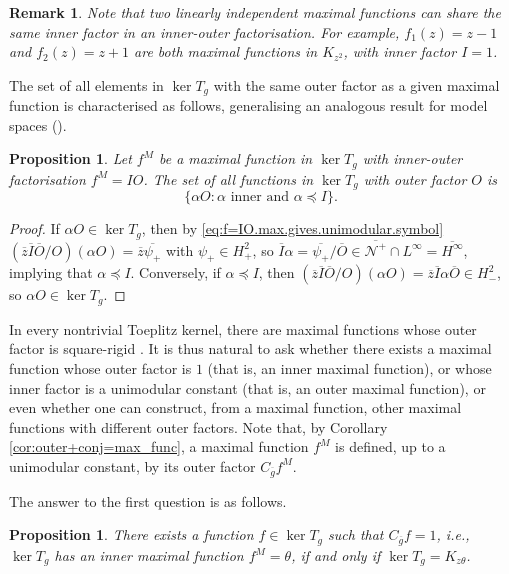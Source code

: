 \documentclass[12pt]{elsarticle}
\numberwithin{equation}{section}
\theoremstyle{plain}
\newtheorem{prop}[thm]{Proposition}
\newtheorem{rem}[thm]{Remark}
\newcommand{\Hp}{\ensuremath{H^2_+}}
\newcommand{\Hm}{\ensuremath{H^2_-}}
\newcommand{\Linf}{\ensuremath{L^\infty}}
\newcommand{\Hinf}{\ensuremath{H^\infty}}
\newcommand{\NN}{\ensuremath{\mathcal{N}^+}}
\newcommand{\Cg}{\ensuremath{C_{\ol g}}}
\newcommand{\ol}[1]{\ensuremath{\overline{#1}}}
\begin{document}
\begin{rem}
Note that two linearly independent maximal functions can share the same inner factor in an inner-outer factorisation.
For example, $f_1 (z) = z-1$ and $f_2(z) = z+1$ are both maximal functions  in $K_{z^2}$, with inner factor $I=1$.
\end{rem}


The set of all elements in $\ker T_g$ with the same outer factor as a given maximal function is characterised as follows, generalising an analogous result for model spaces (\cite[Proposition 8.20]{GarMashRoss16}).


\begin{prop}
Let $f^M$ be a maximal function in $\ker T_g$ with inner-outer factorisation $f^M = IO$.
The set of all functions in $\ker T_g$ with outer factor $O$ is
\[
\{ \alpha O : \alpha \text{ inner and } \alpha \preceq I \}.
\]
\end{prop}


\begin{proof}
If $\alpha O \in \ker T_g$, then by \eqref{eq:f=IO.max.gives.unimodular.symbol} $(\ol z \ol I \ol O / O) (\alpha O) = \ol z \ol{\psi_+}$ with $\psi_+ \in \Hp$, so $\ol I \alpha = \ol{\psi_+} / \ol O \in \ol\NN \cap \Linf = \ol\Hinf$, implying that $\alpha \preceq I$.
Conversely, if $\alpha \preceq I$, then $(\ol z \ol I \ol O / O) (\alpha O) = \ol z \ol I \alpha \ol O \in \Hm$, so $\alpha O \in \ker T_g$. 
\end{proof}


In every nontrivial Toeplitz kernel, there are maximal functions whose outer factor is square-rigid \cite{CMP16}.
It is thus natural to ask whether there exists a maximal function whose outer factor is $1$ (that is, an inner maximal function), or whose inner factor is a unimodular constant (that is, an outer maximal function), or even whether one can construct, from a maximal function, other maximal functions with different outer factors.
Note that, by Corollary \ref{cor:outer+conj=max_func}, a maximal function $f^M$ is defined, up to a unimodular constant, by its outer factor $\Cg f^M$.

The answer to the first question is as follows.


\begin{prop}
\label{prop:inner_maximal_function}
There exists a function $f\in\ker T_g$ such that $\Cg f = 1$, i.e., $\ker T_g$ has an inner maximal function $f^M = \theta$, if and only if $\ker T_g = K_{z \theta}$.
\end{prop}
\end{document}
